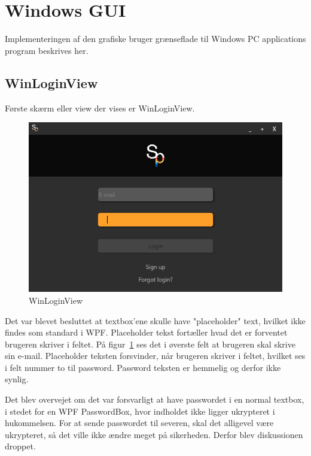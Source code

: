 \section{Windows GUI}
Implementeringen af den grafiske bruger grænseflade til Windows PC applications program beskrives her.
\subsection{WinLoginView}
Første skærm eller view der vises er WinLoginView.
\begin{figure}
	\centering
	\includegraphics[width=0.7\linewidth]{figs/implementering/winloginview}
	\caption{WinLoginView}
	\label{fig:winloginview}
\end{figure}
Det var blevet besluttet at textbox'ene skulle have "placeholder" text, hvilket ikke findes som standard i WPF. Placeholder tekst fortæller hvad det er forventet brugeren skriver i feltet. På figur~\ref{fig:winloginview} ses det i øverste felt at brugeren skal skrive sin e-mail. Placeholder teksten forsvinder, når brugeren skriver i feltet, hvilket ses i felt nummer to til password. Password teksten er hemmelig og derfor ikke synlig. 

Det blev overvejet om det var forsvarligt at have passwordet i en normal textbox, i stedet for en WPF PasswordBox, hvor indholdet ikke ligger ukrypteret i hukommelsen. 
For at sende passwordet til severen, skal det alligevel være ukrypteret, så det ville ikke ændre meget på sikerheden. Derfor blev diskussionen droppet.

